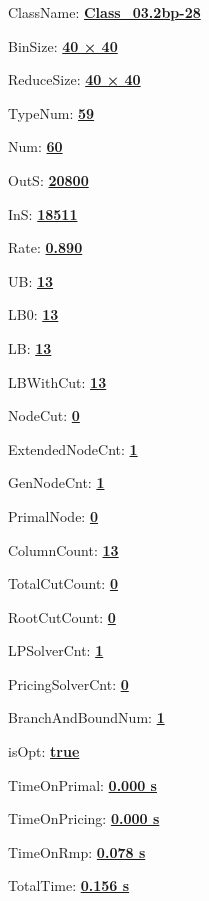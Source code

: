 \documentclass[11pt]{article}
\begin{document}
\pagestyle{empty}


ClassName: \underline{\textbf{Class_03.2bp-28}}
\par
BinSize: \underline{\textbf{40 × 40}}
\par
ReduceSize: \underline{\textbf{40 × 40}}
\par
TypeNum: \underline{\textbf{59}}
\par
Num: \underline{\textbf{60}}
\par
OutS: \underline{\textbf{20800}}
\par
InS: \underline{\textbf{18511}}
\par
Rate: \underline{\textbf{0.890}}
\par
UB: \underline{\textbf{13}}
\par
LB0: \underline{\textbf{13}}
\par
LB: \underline{\textbf{13}}
\par
LBWithCut: \underline{\textbf{13}}
\par
NodeCut: \underline{\textbf{0}}
\par
ExtendedNodeCnt: \underline{\textbf{1}}
\par
GenNodeCnt: \underline{\textbf{1}}
\par
PrimalNode: \underline{\textbf{0}}
\par
ColumnCount: \underline{\textbf{13}}
\par
TotalCutCount: \underline{\textbf{0}}
\par
RootCutCount: \underline{\textbf{0}}
\par
LPSolverCnt: \underline{\textbf{1}}
\par
PricingSolverCnt: \underline{\textbf{0}}
\par
BranchAndBoundNum: \underline{\textbf{1}}
\par
isOpt: \underline{\textbf{true}}
\par
TimeOnPrimal: \underline{\textbf{0.000 s}}
\par
TimeOnPricing: \underline{\textbf{0.000 s}}
\par
TimeOnRmp: \underline{\textbf{0.078 s}}
\par
TotalTime: \underline{\textbf{0.156 s}}
\par
\newpage


\end{document}
